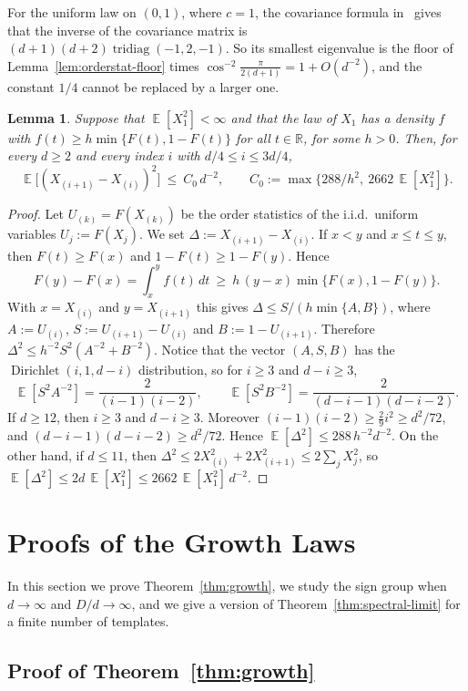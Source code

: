 \documentclass[11pt]{article}
\newcommand{\R}{\mathbb{R}}
\newtheorem{lem}[theor]{Lemma}
\theoremstyle{definition}
\DeclareMathOperator{\EX}{\mathbb{E}}
\begin{document}
For the uniform law on $(0,1)$, where $c=1$, the covariance formula
in~\cite{david2003order} gives that the inverse of the covariance matrix is
$(d+1)(d+2)\operatorname{tridiag}(-1,2,-1)$. So its smallest eigenvalue is the floor of
Lemma~\ref{lem:orderstat-floor} times $\cos^{-2}\tfrac{\pi}{2(d+1)}=1+O(d^{-2})$, and the
constant $1/4$ cannot be replaced by a larger one.


\begin{lem}
	\label{lem:central-spacing}
	Suppose that $\EX[X_1^2]<\infty$ and that the law of $X_1$ has a density $f$ with
	$f(t)\ge h\min\{F(t),1-F(t)\}$ for all $t\in\R$, for some $h>0$. Then, for every
	$d\ge2$ and every index $i$ with $d/4\le i\le3d/4$,
	\[
	\EX\bigl[(X_{(i+1)}-X_{(i)})^2\bigr]\ \le\ C_0\,d^{-2},
	\qquad C_0:=\max\bigl\{288/h^2,\ 2662\,\EX[X_1^2]\bigr\}.
	\]
\end{lem}

\begin{proof}
	 Let $U_{(k)}=F(X_{(k)})$ be the order
	statistics of the i.i.d.\ uniform variables $U_j:=F(X_j)$. We set $\Delta:=X_{(i+1)}-X_{(i)}$. If $x<y$ and $x\le t\le y$, then $F(t)\ge F(x)$ and
	$1-F(t)\ge1-F(y)$. Hence
	\[
	F(y)-F(x)=\int_x^yf(t)\,dt\ \ge\ h\,(y-x)\min\{F(x),1-F(y)\}.
	\]
	With $x=X_{(i)}$ and $y=X_{(i+1)}$ this gives $\Delta\le S/(h\min\{A,B\})$, where
	$A:=U_{(i)}$, $S:=U_{(i+1)}-U_{(i)}$ and $B:=1-U_{(i+1)}$. Therefore
	$\Delta^2\le h^{-2}S^2(A^{-2}+B^{-2})$. Notice that the vector $(A,S,B)$ has the
	$\operatorname{Dirichlet}(i,1,d-i)$ distribution, so for $i\ge3$ and $d-i\ge3$,
	\[
	\EX[S^2A^{-2}]=\frac{2}{(i-1)(i-2)},\qquad
	\EX[S^2B^{-2}]=\frac{2}{(d-i-1)(d-i-2)}.
	\]
	If $d\ge12$, then $i\ge3$ and $d-i\ge3$. Moreover $(i-1)(i-2)\ge\frac29i^2\ge d^2/72$,
	and $(d-i-1)(d-i-2)\ge d^2/72$. Hence $\EX[\Delta^2]\le288\,h^{-2}d^{-2}$. On the other hand, if $d\le11$, then
	$\Delta^2\le2X_{(i)}^2+2X_{(i+1)}^2\le2\sum_jX_j^2$, so $\EX[\Delta^2]\le2d\,\EX[X_1^2]\le2662\,\EX[X_1^2]\,d^{-2}$.
\end{proof}


\section{Proofs of the Growth Laws}\label{sec:proofs}

In this section we prove Theorem~\ref{thm:growth},
we study the sign group when $d\to\infty$ and $D/d\to\infty$, and we give a version of
Theorem~\ref{thm:spectral-limit} for a finite number of templates.

\subsection{Proof of Theorem~\ref{thm:growth}}
\label{app:bc}
\end{document}
